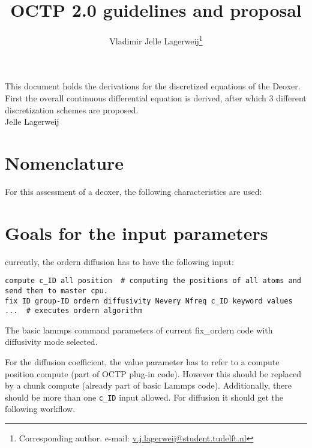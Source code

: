 \documentclass{article-Bram}
\title{OCTP 2.0 guidelines and proposal}
\subtitle{}
\author{Vladimir Jelle Lagerweij\thanks{Corresponding author. e-mail: \href{mailto:v.j.lagerweij@student.tudelft.nl}{v.j.lagerweij@student.tudelft.nl}}}
\institute{Delft University of Technology}
\begin{document}
\maketitle
This document holds the derivations for the discretized equations of the Deoxer. First the overall continuous differential equation is derived, after which 3 different discretization schemes are proposed.\\
Jelle Lagerweij
\section{Nomenclature}
For this assessment of a deoxer, the following characteristics are used:


\section{Goals for the input parameters}
currently, the ordern diffusion has to have the following input:

\begin{listing}[ht!]
	\centering
	\begin{verbatim}
compute c_ID all position  # computing the positions of all atoms and send them to master cpu.
fix ID group-ID ordern diffusivity Nevery Nfreq c_ID keyword values ...  # executes ordern algorithm
	\end{verbatim}
	\caption{The basic lammps command parameters of current fix\_ordern code with diffusivity mode selected.}
	\label{current input}
\end{listing}

For the diffusion coefficient, the value parameter has to refer to a compute position compute (part of OCTP plug-in code). However this should be replaced by a chunk compute (already part of basic Lammps code). Additionally, there should be more than one \texttt{c_ID} input allowed. For diffusion it should get the following workflow.
\end{document}
